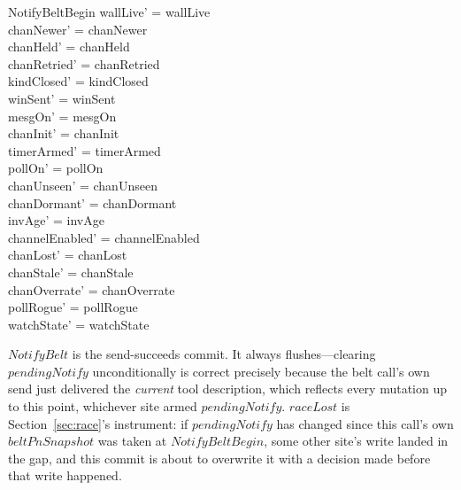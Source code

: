 \documentclass[a4paper,10pt,fleqn]{article}
\begin{document}
\begin{schema}{NotifyBeltBegin}
  wallLive' = wallLive \\
  chanNewer' = chanNewer \\
  chanHeld' = chanHeld \\
  chanRetried' = chanRetried \\
  kindClosed' = kindClosed \\
  winSent' = winSent \\
  mesgOn' = mesgOn \\
  chanInit' = chanInit \\
  timerArmed' = timerArmed \\
  pollOn' = pollOn \\
  chanUnseen' = chanUnseen \\
  chanDormant' = chanDormant \\
  invAge' = invAge \\
  channelEnabled' = channelEnabled \\
  chanLost' = chanLost \\
  chanStale' = chanStale \\
  chanOverrate' = chanOverrate \\
  pollRogue' = pollRogue \\
  watchState' = watchState
\end{schema}

$NotifyBelt$ is the send-succeeds commit.  It always flushes---clearing
$pendingNotify$ unconditionally is correct precisely because the belt
call's own send just delivered the \emph{current} tool description,
which reflects every mutation up to this point, whichever site armed
$pendingNotify$.  $raceLost$ is Section~\ref{sec:race}'s instrument: if
$pendingNotify$ has changed since this call's own $beltPnSnapshot$ was
taken at $NotifyBeltBegin$, some other site's write landed in the gap,
and this commit is about to overwrite it with a decision made before
that write happened.
\end{document}
